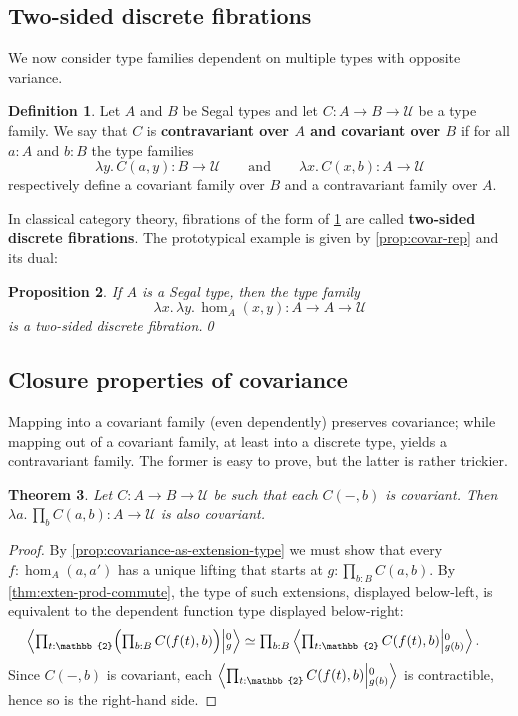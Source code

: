 \documentclass[12pt]{amsart}
\theoremstyle{plain}
\newtheorem{thm}{Theorem}[section]
\newtheorem{prop}[thm]{Proposition}
\theoremstyle{definition}
\newtheorem{defn}[thm]{Definition}
\theoremstyle{remark}
\numberwithin{equation}{section}
\newcommand{\tprod}{\textstyle\prod}
\newcommand{\exten}[4]{\left\langle\mathchoice{\textstyle\prod_{#1}}{\textstyle\prod_{#1}}{\scriptstyle\prod_{#1}}{\scriptscriptstyle\prod_{#1}} #2 \middle|^{#3}_{#4}\right\rangle}
\newcommand{\univtype}{\mathcal{U}}
\newcommand{\lam}[1]{\lambda #1.\,}
\newcommand{\two}{\mathbb{2}}
\newcommand{\Parens}[1]{\Bigl(#1\Bigr)}
\begin{document}
\subsection{Two-sided discrete fibrations}

We now consider type families dependent on multiple types with opposite variance.

\begin{defn}\label{defn:two-sided-discrete}
  Let $A$ and $B$ be Segal types and let $C : A \to B \to \univtype$ be a type family. We say that $C$ is \textbf{contravariant over $A$ and covariant over $B$} if for all $a : A$ and $b : B$ the type families
  \[ \lam{y}C(a,y) : B \to \univtype \qquad \mathrm{and} \qquad \lam{x}C(x,b) : A \to \univtype\] respectively define a covariant family over $B$ and a contravariant family over $A$.
\end{defn}

In classical category theory, fibrations of the form of \cref{defn:two-sided-discrete} are called \textbf{two-sided discrete fibrations}. The prototypical example is given by \cref{prop:covar-rep} and its dual:

\begin{prop}\label{prop:hom-bifunctor}
If $A$ is a Segal type, then the type family
\[ \lam{x}\lam{y} \hom_A(x,y) : A \to A \to \univtype\] is a two-sided discrete fibration.\qed
\end{prop}

\subsection{Closure properties of covariance}
\label{sec:closure-of-covariance}

Mapping into a covariant family (even dependently) preserves covariance; while mapping out of a covariant family, at least into a discrete type, yields a contravariant family.
The former is easy to prove, but the latter is rather trickier.

\begin{thm}\label{thm:prod-covar}
  Let $C:A\to B\to \univtype$ be such that each $C(-,b)$ is covariant.
  Then $\lam{a} \prod_b C(a,b) : A \to \univtype$ is also covariant.
\end{thm}
\begin{proof}
  By \cref{prop:covariance-as-extension-type} we must show that every $f:\hom_A(a,a')$ has a unique lifting that starts at $g:\prod_{b:B} C(a,b)$. By \cref{thm:exten-prod-commute}, the type of such extensions, displayed below-left, is equivalent to the dependent function type displayed below-right:
  \begin{align*}
    \exten{t:\two}{\Parens{\tprod_{b:B} C(f(t),b)}}{0}{g}
    &\simeq \tprod_{b:B} \exten{t:\two}{C(f(t),b)}{0}{g(b)}.
  \end{align*}
  Since $C(-,b)$ is covariant, each $\exten{t:\two}{C(f(t),b)}{0}{g(b)}$ is contractible, hence so is the right-hand side.
\end{proof}
\end{document}

